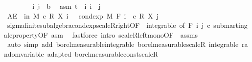 \begin{isabellebody}
%
\isadelimproof
%
\endisadelimproof
%
\isatagproof
{}\isamarkupfalse%
\isanewline
\ \ \isacommand{{\isacharbraceleft}{\kern0pt}}\isamarkupfalse%
\isanewline
\ \ \ \ \isamarkupfalse%
\ i\ j\ {\isacharcolon}{\kern0pt}{\isacharcolon}{\kern0pt}\ {\isacharprime}{\kern0pt}b\ \isamarkupfalse%
\ asm{\isacharcolon}{\kern0pt}\ {\isachardoublequoteopen}t\ {\isasymle}\ i{\isachardoublequoteclose}\ {\isachardoublequoteopen}i\ {\isasymle}\ j{\isachardoublequoteclose}\isanewline
\ \ \ \ \isamarkupfalse%
\ {\isachardoublequoteopen}AE\ {\isasymxi}\ in\ M{\isachardot}{\kern0pt}\ c\ {\isacharasterisk}{\kern0pt}\isactrlsub R\ X\ i\ {\isasymxi}\ {\isasymle}\ cond{\isacharunderscore}{\kern0pt}exp\ M\ {\isacharparenleft}{\kern0pt}F\ i{\isacharparenright}{\kern0pt}\ {\isacharparenleft}{\kern0pt}{\isasymlambda}{\isasymxi}{\isachardot}{\kern0pt}\ c\ {\isacharasterisk}{\kern0pt}\isactrlsub R\ X\ j\ {\isasymxi}{\isacharparenright}{\kern0pt}\ {\isasymxi}{\isachardoublequoteclose}\ \ \isanewline
\ \ \ \ \ \ \isamarkupfalse%
\ sigma{\isacharunderscore}{\kern0pt}finite{\isacharunderscore}{\kern0pt}subalgebra{\isachardot}{\kern0pt}cond{\isacharunderscore}{\kern0pt}exp{\isacharunderscore}{\kern0pt}scaleR{\isacharunderscore}{\kern0pt}right{\isacharbrackleft}{\kern0pt}OF\ {\isacharunderscore}{\kern0pt}\ integrable{\isacharcomma}{\kern0pt}\ of\ {\isachardoublequoteopen}F\ i{\isachardoublequoteclose}\ j\ c{\isacharbrackright}{\kern0pt}\ submartingale{\isacharunderscore}{\kern0pt}property{\isacharbrackleft}{\kern0pt}OF\ asm{\isacharbrackright}{\kern0pt}\ \isamarkupfalse%
\ {\isacharparenleft}{\kern0pt}fastforce\ intro{\isacharbang}{\kern0pt}{\isacharcolon}{\kern0pt}\ scaleR{\isacharunderscore}{\kern0pt}left{\isacharunderscore}{\kern0pt}mono{\isacharbrackleft}{\kern0pt}OF\ {\isacharunderscore}{\kern0pt}\ assms{\isacharbrackright}{\kern0pt}{\isacharparenright}{\kern0pt}\isanewline
\ \ \isacommand{{\isacharbraceright}{\kern0pt}}\isamarkupfalse%
\isanewline
{}\isamarkupfalse%
\ {\isacharparenleft}{\kern0pt}auto\ simp\ add{\isacharcolon}{\kern0pt}\ borel{\isacharunderscore}{\kern0pt}measurable{\isacharunderscore}{\kern0pt}integrable\ borel{\isacharunderscore}{\kern0pt}measurable{\isacharunderscore}{\kern0pt}scaleR\ integrable\ random{\isacharunderscore}{\kern0pt}variable\ adapted\ borel{\isacharunderscore}{\kern0pt}measurable{\isacharunderscore}{\kern0pt}const{\isacharunderscore}{\kern0pt}scaleR{\isacharparenright}{\kern0pt}%
\endisatagproof
{\isafoldproof}%

\end{isabellebody}
